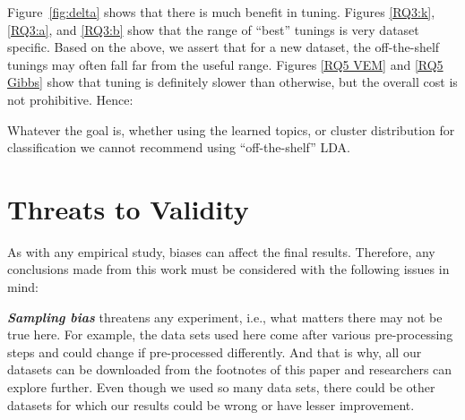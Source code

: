 \documentclass[twocolumn,5p,sort&compress]{elsarticle}
\newcommand{\bi}{\begin{itemize}}
\newcommand{\ei}{\end{itemize}}
\theoremstyle{break}
\begin{document}
  Figure~\ref{fig:delta} shows that there is much benefit in tuning.
  Figures \ref{RQ3:k}, \ref{RQ3:a}, and \ref{RQ3:b} show that
  the range of ``best'' tunings is very dataset specific. 
    Based on the above, we assert that
  for a new dataset,
  the off-the-shelf tunings
  may often fall far from the useful range.
  Figures \ref{RQ5 VEM} and \ref{RQ5 Gibbs} show that tuning is definitely
  slower than otherwise, but the overall cost is not prohibitive.
  Hence:
  \begin{lesson}
    Whatever the goal is, whether using the learned topics, or cluster distribution for classification
    we cannot recommend using ``off-the-shelf'' LDA.
  \end{lesson}



\section{Threats to Validity}
\label{sect:validity}

As with any empirical study, biases can affect the final
results. Therefore, any conclusions made from this work must be considered with the following issues in mind:

\textbf{\textit{Sampling bias}} threatens any experiment, i.e., what matters there may not be true here. For example,
the data sets used here come after various pre-processing steps and could change if pre-processed differently. And that is why, all our datasets can be downloaded from the footnotes of this paper and researchers can explore further. Even though we used so many data sets, there could be other datasets for which our results could be wrong or have lesser improvement.
\end{document}

